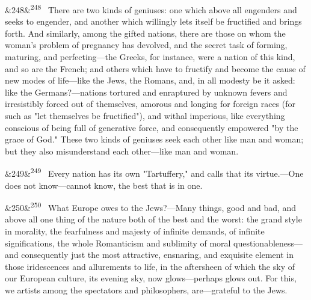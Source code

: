 \documentclass[12pt]{article}
\newcommand{\para}[1][]{\par\noindent\ifx&#1&\else\textsuperscript{\footnotesize #1}~\fi}
\begin{document}
\para[248] There are two kinds of geniuses: one which above all engenders and seeks to engender, and another which willingly lets itself be fructified and brings forth. And similarly, among the gifted nations, there are those on whom the woman's problem of pregnancy has devolved, and the secret task of forming, maturing, and perfecting---the Greeks, for instance, were a nation of this kind, and so are the French; and others which have to fructify and become the cause of new modes of life---like the Jews, the Romans, and, in all modesty be it asked: like the Germans?---nations tortured and enraptured by unknown fevers and irresistibly forced out of themselves, amorous and longing for foreign races (for such as "let themselves be fructified"), and withal imperious, like everything conscious of being full of generative force, and consequently empowered "by the grace of God." These two kinds of geniuses seek each other like man and woman; but they also misunderstand each other---like man and woman.

\para[249] Every nation has its own "Tartuffery," and calls that its virtue.---One does not know---cannot know, the best that is in one.

\para[250] What Europe owes to the Jews?---Many things, good and bad, and above all one thing of the nature both of the best and the worst: the grand style in morality, the fearfulness and majesty of infinite demands, of infinite significations, the whole Romanticism and sublimity of moral questionableness---and consequently just the most attractive, ensnaring, and exquisite element in those iridescences and allurements to life, in the aftersheen of which the sky of our European culture, its evening sky, now glows---perhaps glows out. For this, we artists among the spectators and philosophers, are---grateful to the Jews.
\end{document}
